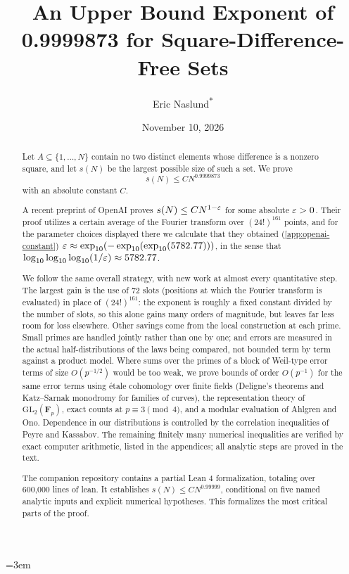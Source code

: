 \documentclass[11pt]{amsart}
\title[Exponent 0.9999873 for square-difference-free sets]{An Upper Bound Exponent of 0.9999873 for Square-Difference-Free Sets}
\author[]{Eric Naslund\textsuperscript{$*$}}
\date{November 10, 2026}
\begin{document}
\emergencystretch=3em
\begin{abstract}
Let $A\subseteq\{1,\ldots,N\}$ contain no two distinct elements whose
difference is a nonzero square, and let $s(N)$ be the largest possible
size of such a set. We prove
\[
  s(N)\le CN^{0.9999873}
\]
with an absolute constant $C$.

A recent preprint of OpenAI proves $s(N)\le CN^{1-\varepsilon}$ for some
absolute $\varepsilon>0$. Their proof utilizes a certain average
of the Fourier transform over $(24!)^{161}$ points,
and for the parameter choices displayed there we calculate that they obtained
(\cref{app:openai-constant})
$\varepsilon\approx \exp_{10}(-\exp_{10}(\exp_{10}(5782.77)))$, in the sense that
$\log_{10}\log_{10}\log_{10}(1/\varepsilon)\approx5782.77$.

We follow the same overall strategy, with new work at almost every
quantitative step. The largest gain is the use of $72$ slots (positions at which
the Fourier transform is evaluated) in
place of $(24!)^{161}$: the exponent is roughly a fixed constant
divided by the number of slots, so this alone gains many orders of
magnitude, but leaves far less room for loss elsewhere. Other
savings come from the local construction at each prime.
Small primes are handled jointly rather than one by one;
and errors are measured in the actual half-distributions of the
laws being compared, not bounded term by term against a product
model. Where sums over the primes of a block of
Weil-type error terms of size $O(p^{-1/2})$ would be too weak, we
prove bounds of order $O(p^{-1})$ for the same error terms
using \'etale cohomology over finite fields (Deligne's theorems
and Katz--Sarnak monodromy for families of curves), the
representation theory of $\mathrm{GL}_2(\mathbf F_p)$, exact counts
at $p\equiv3\pmod4$, and a modular evaluation of Ahlgren and Ono.
Dependence in our distributions is controlled by the correlation
inequalities of Peyre and Kassabov. The remaining finitely many
numerical inequalities are verified by exact computer arithmetic,
listed in the appendices; all analytic steps are proved in the text.

The companion repository \cite{NaslundUpperRepository2026} contains a partial Lean 4 formalization, totaling over 600,000 lines of lean.
It establishes $s(N)\le C N^{0.99999}$, conditional on five named analytic inputs and explicit numerical hypotheses.
This formalizes the most critical parts of the proof.


\end{abstract}
\maketitle
\end{document}
